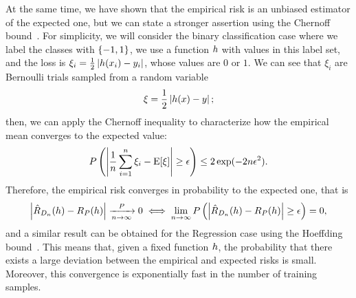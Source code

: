 At the same time, we have shown that the empirical risk is an unbiased estimator of the expected one, but we can state a stronger assertion using the Chernoff bound~\citep{Chernoff52}.
For simplicity, we will consider the binary classification case where we label the classes with $\left\{-1, 1\right\}$, we use a function $h$ with values in this label set, and the loss is $\xi_i = \frac{1}{2} \left|h(x_i) - y_i\right|$, whose values are $0$ or $1$. We can see that $\xi_i$ are Bernoulli trials sampled from a random variable 
$$ \xi = \frac{1}{2} \left|h(x) - y\right| ;$$
then, we can apply the Chernoff inequality to characterize how the empirical mean converges to the expected value:
\begin{equation}
    \nonumber
    P \left(\left|\frac{1}{n} \sum_{i=1}^n \xi_i - \operatorname{E}[\xi]\right| \geq \epsilon  \right) \leq 2 \exp(-2n \epsilon^2) .
\end{equation}
Therefore, the empirical risk converges in probability to the expected one, that is
\begin{equation}
    \label{eq:risk_chernoff}
    \abs{\empriskn(\hypf) -\exprisk(\hypf)} \xrightarrow[\nsamples \to \infty]{\distf} 0 \iff \lim_{n \to \infty} P\left(\abs{\empriskn(\hypf) -\exprisk(\hypf)} \geq \epsilon  \right) = 0,
\end{equation}
and a similar result can be obtained for the Regression case using the Hoeffding bound~\citep{Hoeffding63}.
This means that, given a fixed function $h$, the probability that there exists a large deviation between the empirical and expected risks is small. Moreover, this convergence is exponentially fast in the number of training samples.

